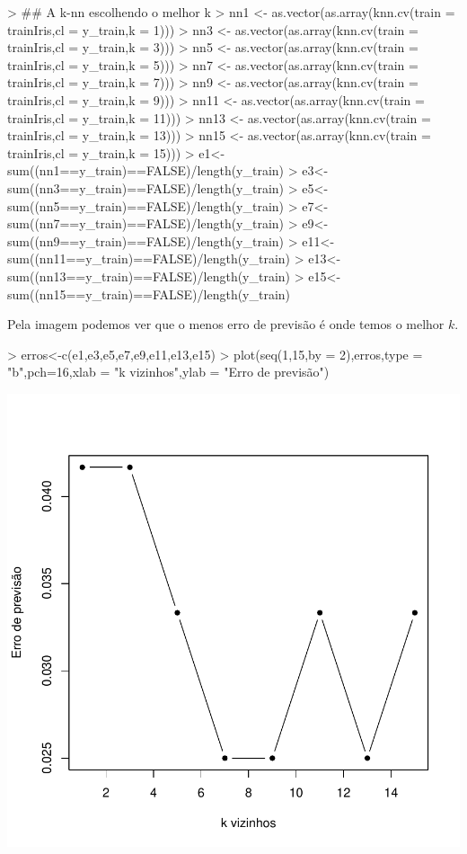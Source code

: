 \documentclass{article}
\begin{document}
\begin{Schunk}
\begin{Sinput}
> ## A k-nn escolhendo o melhor k
> nn1 <- as.vector(as.array(knn.cv(train = trainIris,cl = y_train,k = 1)))
> nn3 <- as.vector(as.array(knn.cv(train = trainIris,cl = y_train,k = 3)))
> nn5 <- as.vector(as.array(knn.cv(train = trainIris,cl = y_train,k = 5)))
> nn7 <- as.vector(as.array(knn.cv(train = trainIris,cl = y_train,k = 7)))
> nn9 <- as.vector(as.array(knn.cv(train = trainIris,cl = y_train,k = 9)))
> nn11 <- as.vector(as.array(knn.cv(train = trainIris,cl = y_train,k = 11)))
> nn13 <- as.vector(as.array(knn.cv(train = trainIris,cl = y_train,k = 13)))
> nn15 <- as.vector(as.array(knn.cv(train = trainIris,cl = y_train,k = 15)))
> e1<-sum((nn1==y_train)==FALSE)/length(y_train)
> e3<-sum((nn3==y_train)==FALSE)/length(y_train)
> e5<-sum((nn5==y_train)==FALSE)/length(y_train)
> e7<-sum((nn7==y_train)==FALSE)/length(y_train)
> e9<-sum((nn9==y_train)==FALSE)/length(y_train)
> e11<-sum((nn11==y_train)==FALSE)/length(y_train)
> e13<-sum((nn13==y_train)==FALSE)/length(y_train)
> e15<-sum((nn15==y_train)==FALSE)/length(y_train)
\end{Sinput}
\end{Schunk}

Pela imagem podemos ver que o menos erro de previsão é onde temos o melhor $k$.

\begin{Schunk}
\begin{Sinput}
> erros<-c(e1,e3,e5,e7,e9,e11,e13,e15)
> plot(seq(1,15,by = 2),erros,type = "b",pch=16,xlab = "k vizinhos",ylab = "Erro de previsão")
\end{Sinput}
\end{Schunk}
\includegraphics{lista6-005}
\end{document}
